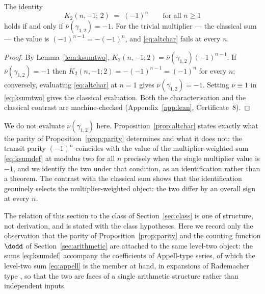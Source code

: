 \begin{proposition}\label{prop:altchar}
The identity
\begin{equation}\label{eq:altchar}
K_2(n, -1;\, 2) \;=\; (-1)^n \qquad \text{for all } n \ge 1
\end{equation}
holds if and only if $\overline{\nu}(\gamma_{1,2}) = -1$. For the
trivial multiplier --- the classical sum --- the value is
$(-1)^{n-1} = -(-1)^n$, and \eqref{eq:altchar} fails at every $n$.
\end{proposition}

\begin{proof}
By Lemma~\ref{lem:ksumtwo},
$K_2(n,-1;2) = \overline{\nu}(\gamma_{1,2})(-1)^{n-1}$. If
$\overline{\nu}(\gamma_{1,2}) = -1$ then
$K_2(n,-1;2) = -(-1)^{n-1} = (-1)^n$ for every $n$; conversely,
evaluating \eqref{eq:altchar} at $n = 1$ gives
$\overline{\nu}(\gamma_{1,2}) = -1$. Setting
$\overline{\nu} \equiv 1$ in \eqref{eq:ksumtwo} gives the classical
evaluation. Both the characterisation and the classical contrast
are machine-checked (Appendix~\ref{app:lean}, Certificate~8).
\end{proof}

\begin{remark}\label{rem:mult}
We do not evaluate $\overline{\nu}(\gamma_{1,2})$ here.
Proposition~\ref{prop:altchar} states exactly what the parity of
Proposition~\ref{prop:parity} determines and what it does not: the
transit parity $(-1)^n$ coincides with the value of the
multiplier-weighted sum \eqref{eq:ksumdef} at modulus two for all
$n$ precisely when the single multiplier value is $-1$, and we
identify the two under that condition, as an identification rather
than a theorem. The contrast with the classical sum shows that the
identification genuinely selects the multiplier-weighted object:
the two differ by an overall sign at every $n$.
\end{remark}

The relation of this section to the class of
Section~\ref{sec:class} is one of structure, not derivation, and is
stated with the class hypotheses. Here we record only the
observation that the parity of Proposition~\ref{prop:parity} and
the counting function $\dodd$ of Section~\ref{sec:arithmetic} are
attached to the same level-two object: the sums \eqref{eq:ksumdef}
accompany the coefficients of Appell-type series, of which the
level-two sum \eqref{eq:appell} is the member at hand, in
expansions of Rademacher type \cite{BringmannOno}, so that the two
are faces of a single arithmetic structure rather than independent
inputs.

